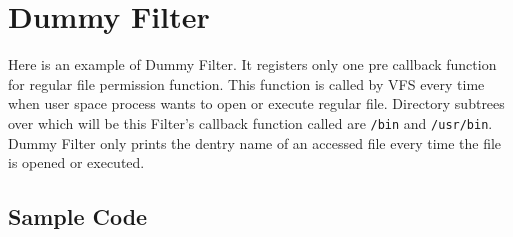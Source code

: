 \chapter{Dummy Filter}
\label{lab:dummy}
Here is an example of Dummy Filter. It registers only one pre callback function for
regular file permission function. This function is called by VFS every time when user
space process wants to open or execute regular file. Directory subtrees over which
will be this Filter's callback function called are \texttt{/bin} and
\texttt{/usr/bin}. Dummy Filter only prints the dentry name of an accessed file every
time the file is opened or executed.

\section{Sample Code}

